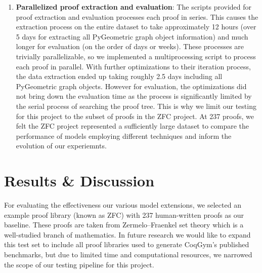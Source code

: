\documentclass{article}
\begin{document}
\begin{enumerate}
    \item \textbf{Parallelized proof extraction and evaluation}: The scripts provided for proof extraction and evaluation processes each proof in series. This causes the extraction process on the entire dataset to take approximately 12 hours (over 5 days for extracting all PyGeometric graph object information) and much longer for evaluation (on the order of days or weeks). These processes are trivially parallelizable, so we implemented a multiprocessing script to process each proof in parallel. With further optimizations to their iteration process, the data extraction ended up taking roughly 2.5 days including all PyGeometric graph objects. However for evaluation, the optimizations did not bring down the evaluation time as the process is significantly limited by the serial process of searching the proof tree. This is why we limit our testing for this project to the subset of proofs in the ZFC project. At 237 proofs, we felt the ZFC project represented a sufficiently large dataset to compare the performance of models employing different techniques and inform the evolution of our experiemnts.
        
    
\end{enumerate}
\section{Results \& Discussion}
For evaluating the effectiveness our various model extensions, we selected an example proof library (known as ZFC) with 237 human-written proofs as our baseline. These proofs are taken from Zermelo–Fraenkel set theory which is a well-studied branch of mathematics. In future research we would like to expand this test set to include all proof libraries used to generate CoqGym's published benchmarks, but due to limited time and computational resources, we narrowed the scope of our testing pipeline for this project. \\

\end{document}

